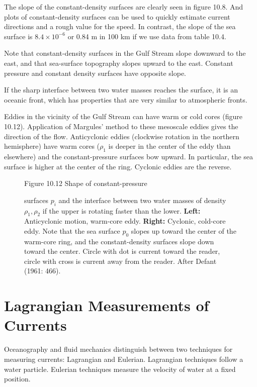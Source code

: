 The slope of the constant-density surfaces are clearly seen in figure
10.8. And plots of constant-density surfaces can be used to quickly
estimate current directions and a rough value for the speed. In
contrast, the slope of the sea surface is $8.4 \times 10^{-6}$ or 0.84
m in 100 km if we use data from table 10.4.

Note that constant-density surfaces in the Gulf Stream slope downward to the east, and that
sea-surface topography slopes upward to the east. Constant pressure
and constant density surfaces have opposite slope.

If the sharp interface between two water masses reaches the surface,
it is an oceanic front, which has properties that are very similar to
atmospheric fronts.

Eddies in the vicinity of the Gulf Stream
can have warm or cold cores (figure 10.12). Application of Margules'
method to these mesoscale eddies gives the
direction of the flow. Anticyclonic eddies (clockwise rotation in the
northern hemisphere) have warm cores ($\rho_1$ is deeper in the center
of the eddy than elsewhere) and the constant-pressure surfaces bow
upward. In particular, the sea surface is higher at the center of the
ring. Cyclonic eddies are the reverse.

\begin{figure}[h!]
\vspace{-1ex}
\footnotesize
Figure 10.12 Shape of constant-pressure \rule{0mm}{4ex}surfaces $p_i$
and the interface between two water masses of density $\rho_1, \rho_2$
if the upper is rotating faster than the lower.  \textbf{Left:}
Anticyclonic motion, warm-core eddy. \textbf{Right:} Cyclonic,
cold-core eddy. Note that the sea surface $p_0$ slopes up toward the
center of the warm-core ring, and the constant-density surfaces slope
down toward the center. Circle with dot is current toward the reader,
circle with cross is current away from the reader. After Defant (1961: 466).
\label{fig:rings}
\vspace{-4ex}
\end{figure}

\section{Lagrangian Measurements of Currents}
Oceanography and fluid mechanics
distinguish between two techniques for measuring currents: Lagrangian
and Eulerian. Lagrangian techniques follow a water particle. Eulerian
techniques measure the velocity of water at a fixed position.

